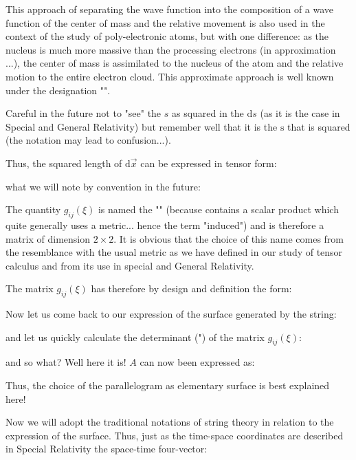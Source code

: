 	\begin{tcolorbox}[title=Remark,colframe=black,arc=10pt]
	This approach of separating the wave function into the composition of a wave function of the center of mass and the relative movement is also used in the context of the study of poly-electronic atoms, but with one difference: as the nucleus is much more massive than the processing electrons (in approximation ...), the center of mass is assimilated to the nucleus of the atom and the relative motion to the entire electron cloud. This approximate approach is well known under the designation "".
	\end{tcolorbox}
	Careful in the future not to "see" the $s$ as squared in the $\mathrm{d}s$ (as it is the case in Special and General Relativity) but remember well that it is the $\mathrm{s}$ that is squared (the notation may lead to confusion...).
	
	Thus, the squared length of $\mathrm{d}\vec{x}$ can be expressed in tensor form:
	
	what we will note by convention in the future:
	
	The quantity $g_{ij}(\xi)$  is named the "" (because contains a scalar product which quite generally uses a metric... hence the term "induced") and is therefore a matrix of dimension $2 \times 2$. It is obvious that the choice of this name comes from the resemblance with the usual metric as we have defined in our study of tensor calculus and from its use in special and General Relativity.
	
	The matrix $g_{ij}(\xi)$ has therefore by design and definition the form:
	
	Now let us come back to our expression of the surface generated by the string:
	
	and let us quickly calculate the determinant (") of the matrix $g_{ij}(\xi)$:
	
	and so what? Well here it is! $A$ can now been expressed as:
	
	Thus, the choice of the parallelogram as elementary surface is best explained here!
	
	Now we will adopt the traditional notations of string theory in relation to the expression of the surface. Thus, just as the time-space coordinates are described in Special Relativity the space-time four-vector:
	
